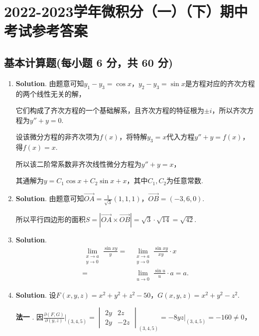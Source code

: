 \documentclass[../Main.tex]{subfiles}
\begin{document}
\chapter{2022-2023学年微积分（一）（下）期中考试参考答案}
\section{基本计算题(每小题 6 分，共 60 分)}
\begin{enumerate}
    \item \textbf{Solution}. 由题意可知$y_{1}-y_{3}=\cos x$，$y_{2}-y_{3}=\sin x$是方程对应的齐次方程的两个线性无关的解，

          它们构成了齐次方程的一个基础解系，且齐次方程的特征根为$\pm i$，所以齐次方程为$y
              ''+y=0$.

          设该微分方程的非齐次项为$f(x)$，将特解$y_{3} = x$代入方程$y''+y=f(x)$，得$f
              (x)=x$.

          所以该二阶常系数非齐次线性微分方程为$y''+y=x$，

          其通解为$y = C_{1}\cos x + C_{2}\sin x + x$，其中$C_{1},C_{2}$为任意常数.

    \item \textbf{Solution}. 由题意可知$\overrightarrow{OA}=\frac{1}{\sqrt{3}}(1,
              1,1)$，$\overrightarrow{OB}=(-3,6,0)$.

          所以平行四边形的面积$S=\left|\overrightarrow{OA}\times \overrightarrow{OB}\right
              |=\sqrt{3}\cdot\sqrt{14}=\sqrt{42}$.

    \item \textbf{Solution}.
          \[
              \begin{aligned}
                  \lim_{\substack{x\to a \\ y\to 0}}\frac{\sin xy}{y}= & \lim_{\substack{x\to a \\ y\to 0}}\frac{\sin xy}{xy}\cdot x \\
                  =                                                    & \lim_{\substack{u\to 0}}\frac{\sin u}{u}\cdot a = a.
              \end{aligned}
          \]

    \item \textbf{Solution}. 设$F(x,y,z) = x^{2}+y^{2}+z^{2}-50$，$G(x,y,z)=x^{2}
              +y^{2}-z^{2}$.

          \textbf{法一} . 因$\frac{\partial (F,G)}{\partial (y,z)}\bigg|_{(3,4,5)}=
              \begin{vmatrix}
                  2y & 2z  \\
                  2y & -2z
              \end{vmatrix}_{(3,4,5)}=\left.-8yz\right|_{(3,4,5)}=-160\neq 0$，


\end{enumerate}
\end{document}
